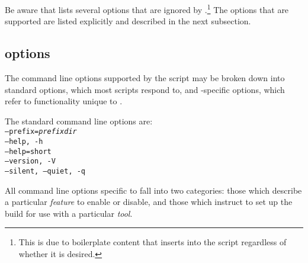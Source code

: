 \noindent
Be aware that \configurehelp lists several options that are ignored by
\libflamens.\footnote{This is due to boilerplate content that \autoconf 
inserts into the \configure script regardless of whether it is desired.}
The options that are supported are listed explicitly and described in
the next subsection.

\subsection{\configure options}
\label{sec:configure-options}


The command line options supported by the \configure script
may be broken down into standard options, which most \configure scripts
respond to, and \libflamens-specific options, which refer to functionality
unique to \libflamens.

The standard command line options are: \\

\noindent
{\tt --prefix={\em prefixdir}} \\
\noindent
{\tt --help, -h} \\
\noindent
{\tt --help=short} \\
\noindent
{\tt --version, -V} \\
\noindent
{\tt --silent, --quiet, -q} \\

All command line options specific to \libflame fall into two categories:
those which describe a particular {\em feature} to enable or disable,
and those which instruct \configure to set up the build for use with a
particular {\em tool}.

